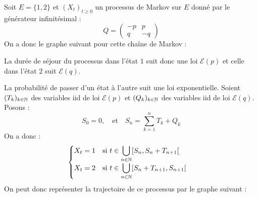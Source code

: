 \begin{example}
    Soit $E = \{1,2\}$ et $(X_t)_{t \geqslant 0}$ un processus de Markov sur $E$ donné par le 
    générateur infinitésimal : 
        $$ Q = 
            \begin{pmatrix}
                -p & p \\ 
                q & -q 
            \end{pmatrix}
        $$ 
    On a donc le graphe suivant pour cette chaîne de Markov : 

    \begin{center}
    \end{center}
    
    La durée de séjour du processus dans l'état $1$ suit donc une loi $ \mathcal{E}(p)$ et celle dans 
    l'état $2$ suit $ \mathcal{E}(q)$.  

    La probabilité de passer d'un état à l'autre suit une loi exponentielle. Soient $(T_k)_{k \in \mathbb{N}}$ 
    des variables iid de loi $ \mathcal{E}(p)$ et $(Q_k)_{k \in \mathbb{N}}$ des variables iid de loi $ \mathcal{E}(q)$. 
    Posons : 
        $$ S_0 = 0, \quad \text{et} \quad S_n = \sum_{k=1}^{n} T_k + Q_k $$ 
    On a donc : 
        $$ 
            \begin{cases}
                \displaystyle X_t = 1 \quad \text{si } t \in \bigcup_{n \in \mathbb{N}} [S_n, S_n + T_{n+1}[ \\[1em]
                \displaystyle X_t = 2 \quad \text{si } t \in \bigcup_{n \in \mathbb{N}} [S_n + T_{n+1}, S_{n+1}[
            \end{cases}   
        $$  
    On peut donc représenter la trajectoire de ce processus par le graphe suivant : 
        \begin{center}
\end{center}
\end{example}
